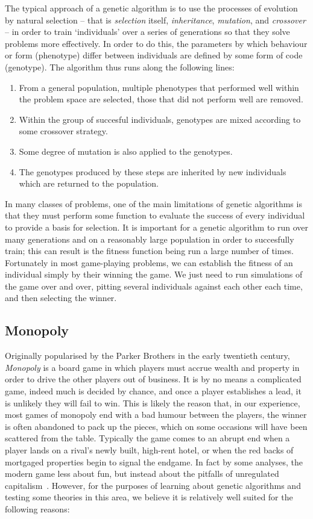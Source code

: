 \documentclass[11pt,a4paper,twocolumn]{scrartcl}
\begin{document}
The typical approach of a genetic algorithm is to use the processes of evolution by natural selection -- that is \textit{selection} itself, \textit{inheritance}, \textit{mutation}, and \textit{crossover} -- in order to train `individuals' over a series of generations so that they solve problems more effectively. In order to do this, the parameters by which behaviour or form (phenotype) differ between individuals are defined by some form of code (genotype). The algorithm thus runs along the following lines: 

\begin{enumerate}
\item From a general population, multiple phenotypes that performed well within the problem space are selected, those that did not perform well are removed.
\item Within the group of succesful individuals, genotypes are mixed according to some crossover strategy. 
\item Some degree of mutation is also applied to the genotypes.
\item The genotypes produced by these steps are inherited by new individuals which are returned to the population.
\end{enumerate}

In many classes of problems, one of the main limitations of genetic algorithms is that they must perform some function to evaluate the success of every individual to provide a basis for selection. It is important for a genetic algorithm to run over many generations and on a reasonably large population in order to succesfully train; this can result is the fitness function being run a large number of times. Fortunately in most game-playing problems, we can establish the fitness of an individual simply by their winning the game. We just need to run simulations of the game over and over, pitting several individuals against each other each time, and then selecting the winner.

\subsection{Monopoly}

Originally popularised by the Parker Brothers in the early twentieth century, \textit{Monopoly} is a board game in which players must accrue wealth and property in order to drive the other players out of business. It is by no means a complicated game, indeed much is decided by chance, and once a player establishes a lead, it is unlikely they will fail to win. This is likely the reason that, in our experience, most games of monopoly end with a bad humour between the players, the winner is often abandoned to pack up the pieces, which on some occasions will have been scattered from the table. Typically the game comes to an abrupt end when a player lands on a rival's newly built, high-rent hotel, or when the red backs of mortgaged properties begin to signal the endgame. In fact by some analyses, the modern game less about fun, but instead about the pitfalls of unregulated capitalism~\cite{ender2004modified}. However, for the purposes of learning about genetic algorithms and testing some theories in this area, we believe it is relatively well suited for the following reasons: 
\end{document}
